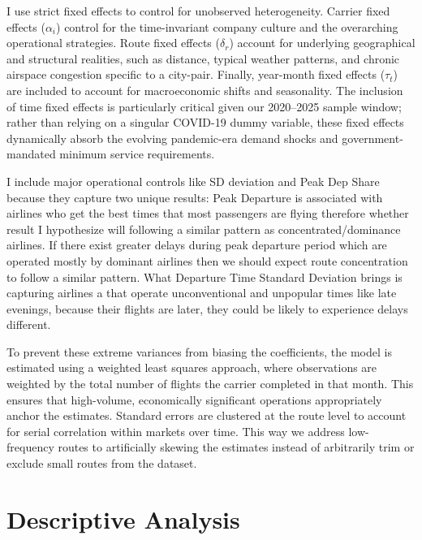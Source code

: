 \documentclass[preprint,12pt,authoryear]{elsarticle}
\begin{document}
\vspace{0.5cm}


I use strict fixed effects to control for unobserved heterogeneity. Carrier fixed effects ($\alpha_i$) control for the time-invariant company culture and the overarching operational strategies. Route fixed effects ($\delta_r$) account for underlying geographical and structural realities, such as distance, typical weather patterns, and chronic airspace congestion specific to a city-pair. Finally, year-month fixed effects ($\tau_t$) are included to account for macroeconomic shifts and seasonality. The inclusion of time fixed effects is particularly critical given our 2020–2025 sample window; rather than relying on a singular COVID-19 dummy variable, these fixed effects dynamically absorb the evolving pandemic-era demand shocks and government-mandated minimum service requirements.

I include major operational controls like SD deviation and Peak Dep Share because they capture two unique results: Peak Departure is associated with airlines who get the best times that most passengers are flying therefore whether result I hypothesize will following a similar pattern as concentrated/dominance airlines. If there exist greater delays during peak departure period which are operated mostly by dominant airlines then we should expect route concentration to follow a similar pattern. What Departure Time Standard Deviation brings is capturing airlines a that operate unconventional and unpopular times like late evenings, because their flights are later, they could be likely to experience delays different. 

To prevent these extreme variances from biasing the coefficients, the model is estimated using a weighted least squares approach, where observations are weighted by the total number of flights the carrier completed in that month. This ensures that high-volume, economically significant operations appropriately anchor the estimates. Standard errors are clustered at the route level to account for serial correlation within markets over time. This way we address low-frequency routes to artificially skewing the estimates instead of arbitrarily trim or exclude small routes from the dataset. 

\section{Descriptive Analysis}
\end{document}
